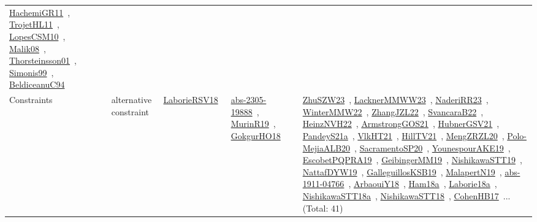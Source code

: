 {\begin{longtable}{lp{3cm}>{\raggedright\arraybackslash}p{6cm}>{\raggedright\arraybackslash}p{6cm}>{\raggedright\arraybackslash}p{8cm}}
\href{works/HachemiGR11.pdf}{HachemiGR11}~\cite{HachemiGR11}, \href{works/TrojetHL11.pdf}{TrojetHL11}~\cite{TrojetHL11}, \href{works/LopesCSM10.pdf}{LopesCSM10}~\cite{LopesCSM10}, \href{works/Malik08.pdf}{Malik08}~\cite{Malik08}, \href{works/Thorsteinsson01.pdf}{Thorsteinsson01}~\cite{Thorsteinsson01}, \href{works/Simonis99.pdf}{Simonis99}~\cite{Simonis99}, \href{works/BeldiceanuC94.pdf}{BeldiceanuC94}~\cite{BeldiceanuC94}\\
Constraints & alternative constraint & \href{works/LaborieRSV18.pdf}{LaborieRSV18}~\cite{LaborieRSV18} & \href{works/abs-2305-19888.pdf}{abs-2305-19888}~\cite{abs-2305-19888}, \href{works/MurinR19.pdf}{MurinR19}~\cite{MurinR19}, \href{works/GokgurHO18.pdf}{GokgurHO18}~\cite{GokgurHO18} & \href{works/ZhuSZW23.pdf}{ZhuSZW23}~\cite{ZhuSZW23}, \href{works/LacknerMMWW23.pdf}{LacknerMMWW23}~\cite{LacknerMMWW23}, \href{works/NaderiRR23.pdf}{NaderiRR23}~\cite{NaderiRR23}, \href{works/WinterMMW22.pdf}{WinterMMW22}~\cite{WinterMMW22}, \href{works/ZhangJZL22.pdf}{ZhangJZL22}~\cite{ZhangJZL22}, \href{works/SvancaraB22.pdf}{SvancaraB22}~\cite{SvancaraB22}, \href{works/HeinzNVH22.pdf}{HeinzNVH22}~\cite{HeinzNVH22}, \href{works/ArmstrongGOS21.pdf}{ArmstrongGOS21}~\cite{ArmstrongGOS21}, \href{works/HubnerGSV21.pdf}{HubnerGSV21}~\cite{HubnerGSV21}, \href{works/PandeyS21a.pdf}{PandeyS21a}~\cite{PandeyS21a}, \href{works/VlkHT21.pdf}{VlkHT21}~\cite{VlkHT21}, \href{works/HillTV21.pdf}{HillTV21}~\cite{HillTV21}, \href{works/MengZRZL20.pdf}{MengZRZL20}~\cite{MengZRZL20}, \href{works/Polo-MejiaALB20.pdf}{Polo-MejiaALB20}~\cite{Polo-MejiaALB20}, \href{works/SacramentoSP20.pdf}{SacramentoSP20}~\cite{SacramentoSP20}, \href{works/YounespourAKE19.pdf}{YounespourAKE19}~\cite{YounespourAKE19}, \href{works/EscobetPQPRA19.pdf}{EscobetPQPRA19}~\cite{EscobetPQPRA19}, \href{works/GeibingerMM19.pdf}{GeibingerMM19}~\cite{GeibingerMM19}, \href{works/NishikawaSTT19.pdf}{NishikawaSTT19}~\cite{NishikawaSTT19}, \href{works/NattafDYW19.pdf}{NattafDYW19}~\cite{NattafDYW19}, \href{works/GalleguillosKSB19.pdf}{GalleguillosKSB19}~\cite{GalleguillosKSB19}, \href{works/MalapertN19.pdf}{MalapertN19}~\cite{MalapertN19}, \href{works/abs-1911-04766.pdf}{abs-1911-04766}~\cite{abs-1911-04766}, \href{works/ArbaouiY18.pdf}{ArbaouiY18}~\cite{ArbaouiY18}, \href{works/Ham18a.pdf}{Ham18a}~\cite{Ham18a}, \href{works/Laborie18a.pdf}{Laborie18a}~\cite{Laborie18a}, \href{works/NishikawaSTT18a.pdf}{NishikawaSTT18a}~\cite{NishikawaSTT18a}, \href{works/NishikawaSTT18.pdf}{NishikawaSTT18}~\cite{NishikawaSTT18}, \href{works/CohenHB17.pdf}{CohenHB17}~\cite{CohenHB17}... (Total: 41)\\

\end{longtable}}
